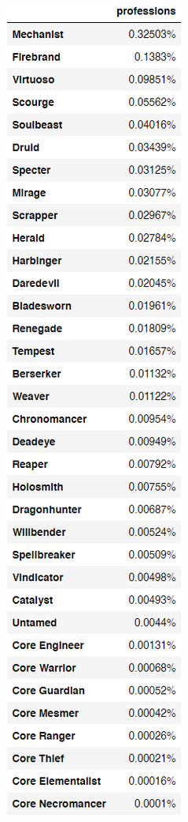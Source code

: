 \documentclass[12pt,a4paper]{article}
\begin{document}
    \begin{figure}
        \centering
        \includegraphics[scale=0.7]{class_percentage.png}
    \end{figure}
\end{document}
